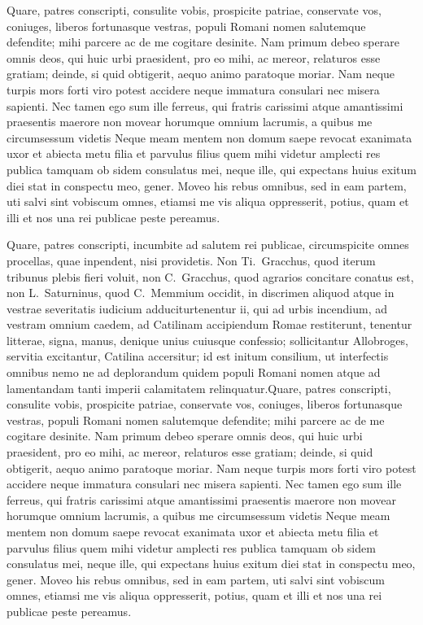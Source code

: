 \documentclass[a4paper,12pt,twoside,swedish]{report}
\begin{document}
Quare, patres conscripti, consulite vobis, prospicite patriae,
conservate vos, coniuges, liberos fortunasque vestras, populi Romani
nomen salutemque defendite; mihi parcere ac de me cogitare desinite. Nam
primum debeo sperare omnis deos, qui huic urbi praesident, pro eo mihi,
ac mereor, relaturos esse gratiam; deinde, si quid obtigerit, aequo
animo paratoque moriar. Nam neque turpis mors forti viro potest accidere
neque immatura consulari nec misera sapienti. Nec tamen ego sum ille
ferreus, qui fratris carissimi atque amantissimi praesentis maerore non
movear horumque omnium lacrumis, a quibus me circumsessum videtis Neque
meam mentem non domum saepe revocat exanimata uxor et abiecta metu filia
et parvulus filius quem mihi videtur amplecti res publica tamquam ob
sidem consulatus mei, neque ille, qui expectans huius exitum diei stat
in conspectu meo, gener. Moveo his rebus omnibus, sed in eam partem, uti
salvi sint vobiscum omnes, etiamsi me vis aliqua oppresserit, potius,
quam et illi et nos una rei publicae peste pereamus.

Quare, patres conscripti, incumbite ad salutem rei publicae,
circumspicite omnes procellas, quae inpendent, nisi providetis. Non
Ti.~Gracchus, quod iterum tribunus plebis fieri voluit, non
C.~Gracchus, quod agrarios concitare conatus est, non L.~Saturninus,
quod C.~Memmium occidit, in discrimen aliquod atque in vestrae
severitatis iudicium adduciturtenentur ii, qui ad urbis incendium, ad
vestram omnium caedem, ad Catilinam accipiendum Romae restiterunt,
tenentur litterae, signa, manus, denique unius cuiusque confessio;
sollicitantur Allobroges, servitia excitantur, Catilina accersitur; id
est initum consilium, ut interfectis omnibus nemo ne ad deplorandum
quidem populi Romani nomen atque ad lamentandam tanti imperii
calamitatem relinquatur.Quare, patres conscripti, consulite vobis, prospicite patriae,
conservate vos, coniuges, liberos fortunasque vestras, populi Romani
nomen salutemque defendite; mihi parcere ac de me cogitare desinite. Nam
primum debeo sperare omnis deos, qui huic urbi praesident, pro eo mihi,
ac mereor, relaturos esse gratiam; deinde, si quid obtigerit, aequo
animo paratoque moriar. Nam neque turpis mors forti viro potest accidere
neque immatura consulari nec misera sapienti. Nec tamen ego sum ille
ferreus, qui fratris carissimi atque amantissimi praesentis maerore non
movear horumque omnium lacrumis, a quibus me circumsessum videtis Neque
meam mentem non domum saepe revocat exanimata uxor et abiecta metu filia
et parvulus filius quem mihi videtur amplecti res publica tamquam ob
sidem consulatus mei, neque ille, qui expectans huius exitum diei stat
in conspectu meo, gener. Moveo his rebus omnibus, sed in eam partem, uti
salvi sint vobiscum omnes, etiamsi me vis aliqua oppresserit, potius,
quam et illi et nos una rei publicae peste pereamus.
\end{document}
